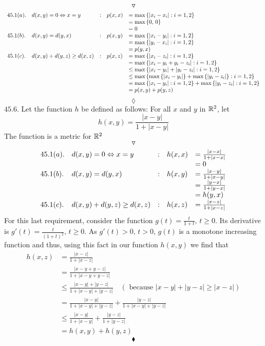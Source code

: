 $$\triangledown$$
\begin{align*}
\begin{array}{l l l l l}
 45.1(a).& d(x, y) = 0 \Leftrightarrow  x =y&:&p(x, x)& =\max{\{|x_i-x_i|: i=1,2\}}\\
 &&&&=\max{\{0,\, 0\}}\\
 &&&&=0\\
 45.1(b). &d(x, y) = d(y, x)&:&p(x, y)&=\max{\{|x_i-y_i|: i=1,2\}}\\
 &&&&=\max{\{|y_i-x_i|: i=1,2\}}\\
  &&&&=p(y,x)\\
45.1 (c). &d(x,y) + d(y, z)\geq d(x, z)&:&p(x, z)&=\max{\{|x_i-z_i|: i=1,2\}}\\
&&&&=\max{\{|x_i-y_i+y_i-z_i|: i=1,2\}}\\
&&&&\leq\max{\{|x_i-y_i|+|y_i-z_i|: i=1,2\}}\\
&&&&\leq\max{\{\max{\{|x_i-y_i|\}}+\max{\{|y_i-z_i|\}}: i=1,2\}}\\
&&&&=\max{\{|x_i-y_i|: i=1,2\}}+\max{\{|y_i-z_i|: i=1,2\}}\\
&&&&= p(x,y)+p(y,z)
\end{array}
\end{align*}
$$\lozenge$$
$\mathbf{45.6.}$ Let the function $h$ be defined as follows: For all $x$ and $y$ in $\mathbb{R}^2$, let
$$h(x,y)=\frac{|x-y|}{1+|x-y|}$$
The function is a metric for $\mathbb{R}^2$
$$\triangledown$$
\begin{align*}
\begin{array}{l l l l l}
 45.1(a).& d(x, y) = 0 \Leftrightarrow  x =y&:&h(x, x)& =\frac{|x-x|}{1+|x-x|}\\
 &&&&=0\\
 45.1(b). &d(x, y) = d(y, x)&:&h(x, y)&=\frac{|x-y|}{1+|x-y|}\\
 &&&&=\frac{|y-x|}{1+|y-x|}\\
 &&&&= h(y,x)\\
45.1 (c). &d(x,y) + d(y, z)\geq d(x, z)&:&h(x, z)&=\frac{|x-z|}{1+|x-z|}
\end{array}
\end{align*}
For this last requirement, consider the function  $g(t)= \frac{t}{1+t},\, t\geq 0$. Its derivative is $g{'}(t)= \frac{t}{(1+t)^2},\, t\geq 0$. As $g{'}(t)>0,\, t>0$, $g(t)$ is a monotone increasing function and thus, using this fact in our function $h(x,y)$ we find that
\begin{align*}
h(x, z)&=\frac{|x-z|}{1+|x-z|}\\
&=\frac{|x-y+y-z|}{1+|x-y+y-z|}\\
&\leq\frac{|x-y|+|y-z|}{1+|x-y|+|y-z|}\quad (\text{ because }|x-y|+|y-z|\geq |x-z|)\\
&=\frac{|x-y|}{1+|x-y|+|y-z|}+\frac{|y-z|}{1+|x-y|+|y-z|}\\
&\leq \frac{|x-y|}{1+|x-y|}+\frac{|y-z|}{1+|y-z|}\\
&=h(x,y)+h(y,z)
\end{align*}
$$\blacklozenge$$

